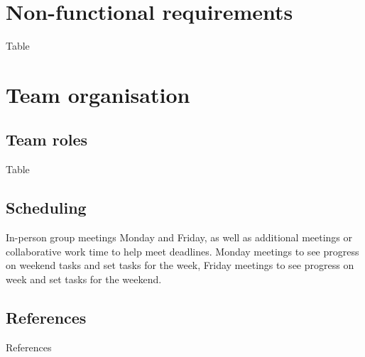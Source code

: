 \documentclass[10pt]{article}
\begin{document}
\vspace{-4mm}\section{Non-functional requirements}\vspace{-2mm}
Table

\vspace{-4mm}\section{Team organisation}\vspace{-2mm}
\subsection{Team roles}\vspace{-2mm}
Table

\vspace{-4mm}\subsection{Scheduling}\vspace{-2mm}
In-person group meetings Monday and Friday, as well as additional meetings or
collaborative work time to help meet deadlines. Monday meetings to see progress
on weekend tasks and set tasks for the week, Friday meetings to see progress on
week and set tasks for the weekend.

\vspace{-4mm}\subsection{References}\vspace{-2mm}
References
\end{document}
